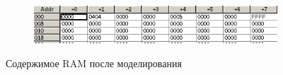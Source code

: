 \begin{figure}[ht]
\centering
  \begin{subfigure}[b]{\textwidth}
    \centering
    \includegraphics[scale=1.15]{ram22}
    \caption{}
  \end{subfigure}
    \caption{Содержимое RAM после моделирования}
\end{figure}
